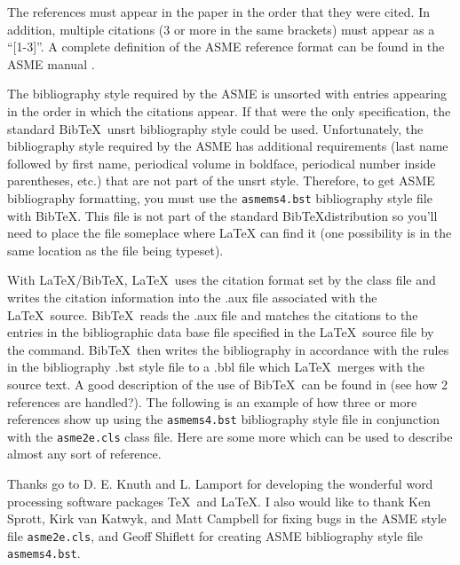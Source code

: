 \documentclass[twocolumn,10pt]{asme2e}
\newcommand\BibTeX{{\sc Bib}\TeX}
\begin{document}
The references must appear in the paper in the order that they were cited.
In addition, multiple citations (3 or more in the same brackets) must appear as a ``[1-3]''.
A complete definition of the ASME reference format can be found in the ASME manual \cite{asmemanual}.

The bibliography style required by the ASME is unsorted with entries appearing in the order in which the citations appear.
If that were the only specification, the standard \BibTeX\ unsrt bibliography style could be used.
Unfortunately, the bibliography style required by the ASME has additional requirements (last name followed by first name, periodical volume in boldface, periodical number inside parentheses, etc.) that are not part of the unsrt style.
Therefore, to get ASME bibliography formatting, you must use the \verb+asmems4.bst+ bibliography style file with \BibTeX. This file is not part of the standard \BibTeX distribution so you'll need to place the file someplace where LaTeX can find it (one possibility is in the same location as the file being typeset).

With \LaTeX/\BibTeX, \LaTeX\ uses the citation format set by the class file and writes the citation information into the .aux file associated with the \LaTeX\ source.
\BibTeX\ reads the .aux file and matches the citations to the entries in the bibliographic data base file specified in the \LaTeX\ source file by the \verb++ command.
\BibTeX\ then writes the bibliography in accordance with the rules in the bibliography .bst style file to a .bbl file which \LaTeX\ merges with the source text.
A good description of the use of \BibTeX\ can be found in \cite{latex, goosens} (see how 2 references are handled?).
The following is an example of how three or more references \cite{latex, asmemanual, goosens} show up using the \verb+asmems4.bst+ bibliography style file in conjunction with the \verb+asme2e.cls+ class file.
Here are some more \cite{art, blt, ibk, icn, ips, mts, mis, pro, pts, trt, upd} which can be used to describe almost any sort of reference.




\begin{acknowledgment}
 Thanks go to D. E. Knuth and L. Lamport for developing the wonderful word processing software packages \TeX\ and \LaTeX. I also would like to thank Ken Sprott, Kirk van Katwyk, and Matt Campbell for fixing bugs in the ASME style file \verb+asme2e.cls+, and Geoff Shiflett for creating ASME bibliography style file \verb+asmems4.bst+.
\end{acknowledgment}
\end{document}
